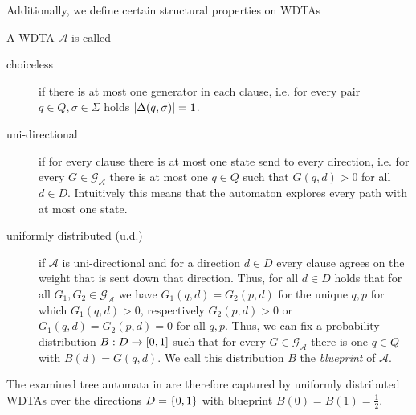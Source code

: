 Additionally, we define certain structural properties on \acp{WDTA}
\begin{definition}
  A \ac{WDTA} $\mathcal{A}$ is called
  \begin{description}
    \item [choiceless] if there is at most one generator in each clause, i.e.
      for every pair $q\in Q, \sigma\in\Sigma$ holds
      $\left\vert{\Delta(q, \sigma)}\right\vert = 1$.
    \item [uni-directional] if for every clause there is at most one state send
      to every direction, i.e. for every $G\in\mathcal{G}_{\mathcal{A}}$
      there is at most one $q\in Q$ such that $G(q, d) > 0$ for all
      $d\in D$. Intuitively this means that the automaton explores every path
      with at most one state.
    \item [uniformly distributed (u.d.)] if $\mathcal{A}$ is uni-directional
      and for a direction $d\in D$ every clause agrees on the weight that is
      sent down that direction. Thus, for all $d\in D$ holds that for all
      $G_{1}, G_{2}\in\mathcal{G}_{\mathcal{A}}$ we have
      $G_{1}(q, d) = G_{2}(p, d)$ for the unique $q, p$ for which
      $G_{1}(q, d) > 0$, respectively $G_{2}(p, d) > 0$ or
      $G_{1}(q, d) = G_{2}(p, d) = 0$ for all $q, p$. Thus, we can fix a
      probability distribution $B:D\rightarrow \left[0,1\right]$ such that for
      every $G\in\mathcal{G}_{\mathcal{A}}$ there is one $q\in Q$ with
      $B(d) = G(q, d)$. We call this distribution $B$ the \emph{blueprint} of
      $\mathcal{A}$. 
  \end{description}
\end{definition}
The examined tree automata in \cite{RandAutoInfTrees} are therefore captured by
uniformly distributed \acp{WDTA} over the directions $D = \left\{0,1\right\}$ with
blueprint $B(0) = B(1) = \frac{1}{2}$.

